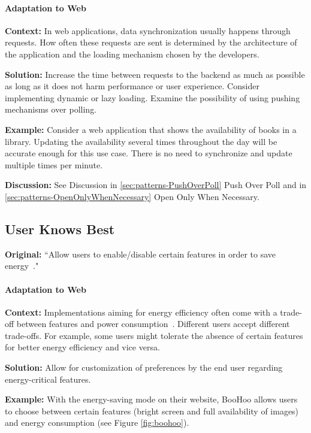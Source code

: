 \paragraph{Adaptation to Web}\mbox{}

\textbf{Context:} In web applications, data synchronization usually happens through requests. How often these requests are sent is determined by the architecture of the application and the loading mechanism chosen by the developers.

\textbf{Solution:} Increase the time between requests to the backend as much as possible as long as it does not harm performance or user experience. Consider implementing dynamic or lazy loading. Examine the possibility of using pushing mechanisms over polling.

\textbf{Example:} Consider a web application that shows the availability of books in a library. Updating the availability several times throughout the day will be accurate enough for this use case. There is no need to synchronize and update multiple times per minute.

\textbf{Discussion:} See Discussion in \ref{sec:patterns-PushOverPoll} Push Over Poll and in \ref{sec:patterns-OpenOnlyWhenNecessary} Open Only When Necessary.


\subsection{User Knows Best} \label{sec:patterns-UserKnowsBest}
\textbf{Original:} ``Allow users to enable/disable certain features in order to save energy~\cite{cruz2019catalog}."

\paragraph{Adaptation to Web}\mbox{}

\textbf{Context:} Implementations aiming for energy efficiency often come with a trade-off between features and power consumption~\cite{cruz2019catalog}. Different users accept different trade-offs. For example, some users might tolerate the absence of certain features for better energy efficiency and vice versa.

\textbf{Solution:} Allow for customization of preferences by the end user regarding energy-critical features.

\textbf{Example:} With the energy-saving mode on their website, BooHoo \cite{boohoo-website} allows users to choose between certain features (bright screen and full availability of images) and energy consumption (see Figure \ref{fig:boohoo}).

